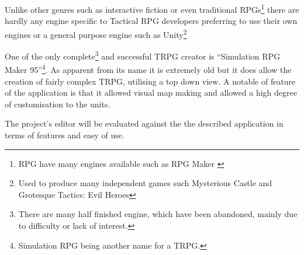 Unlike other genres such as interactive fiction\cite{Bogdan2010Interactive-Fic} or even traditional RPGs\footnote{RPG have many engines available such as RPG Maker \cite{rpgmaker}} there are hardly any engine specific to Tactical RPG developers preferring to use their own engines or a general purpose engine such as Unity\footnote{Used to produce many independent games such Mysterious Castle and Grotesque Tactics: Evil Heroes}

One of the only complete\footnote{There are many half finished engine, which have been abandoned, mainly due to difficulty or lack of interest.} and successful TRPG creator is ``Simulation RPG Maker 95''\footnote{Simulation RPG being another name for a TRPG.}.  As apparent from its name it is extremely old but it does allow the creation of fairly complex TRPG, utilising a top down view. A notable of feature of the application is that it allowed visual map making and allowed a high degree of customisation to the units. 

The project's editor will be evaluated against the the described application in terms of features and easy of use. 

